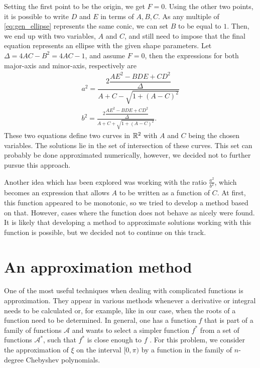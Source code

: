 Setting the first point to be the origin, we get $F=0$. Using the other two points, it is possible to write $D$ and $E$ in terms of $A, B, C$. As any multiple of \autoref{eq:gen_ellipse} represents the same conic, we can set $B$ to be equal to $1$. Then, we end up with two variables, $A$ and $C$, and still need to impose that the final equation represents an ellipse with the given shape parameters. Let $\Delta=4AC-B^2=4AC-1$, and assume $F=0$, then the expressions for both major-axis and minor-axis, respectively are
\begin{align}\label{eq:gen_ellipse_a}
a^2 = \dfrac{2\dfrac{AE^2 -BDE +CD^2}{\Delta}}{A + C - \sqrt{1 + (A-C)^2}}\\
\label{eq:gen_ellipse_b}b^2 = \frac{2\dfrac{AE^2 -BDE +CD^2}{\Delta}}{A + C + \sqrt{1 + (A-C)^2}}.
\end{align}
These two equations define two curves in $\mathbb{R}^2$ with $A$ and $C$ being the chosen variables. The solutions lie in the set of intersection of these curves. This set can probably be done approximated numerically, however, we decided not to further pursue this approach.

Another idea which has been explored was working with the ratio $\frac{a^2}{b^2}$, which becomes an expression that allows $A$ to be written as a function of $C$. At first, this function appeared to be monotonic, so we tried to develop a method based on that. However, cases where the function does not behave as nicely were found. It is likely that developing a method to approximate solutions working with this function is possible, but we decided not to continue on this track.


\section{An approximation method}

One of the most useful techniques when dealing with complicated functions is approximation. They appear in various methods whenever a derivative or integral needs to be calculated or, for example, like in our case, when the roots of a function need to be determined. In general, one has a function $f$ that is part of a family of functions $\mathcal{A}$ and wants to select a simpler function $f^*$ from a set of functions $\mathcal{A^*}$, such that $f^*$ is close enough to $f$ \cite[p.~3]{powell}. For this problem, we consider the approximation of $\xi$ on the interval $[0, \pi)$ by a function in the family of $n$-degree Chebyshev polynomials.

